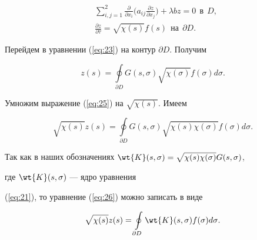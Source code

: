 \begin{equation}\label{eq:24}


\begin{split}


&\sum\limits_{i,j=1}^2 {\frac{\partial }{\partial x_i }


\bigg({a_{ij} \frac{\partial z}{\partial x_j }} \bigg)}+\lambda bz=0


\ \ \text{в} \ \ D,\\


&\frac{\partial z}{\partial \overline \tau }=\sqrt {\chi (s)} f (s)


\ \ \text{на} \ \ \partial D.


\end{split}


\end{equation}


Перейдем в уравнении (\ref{eq:23}) на контур $\partial D$. Получим


\begin{equation}\label{eq:25}


z (s)=\oint\limits_{\partial D} {G ({s,\sigma } )


\sqrt {\chi (\sigma)} f (\sigma)} d\sigma.


\end{equation}


Умножим выражение (\ref{eq:25}) на $\sqrt {\chi (s)} $. Имеем


\begin{equation}\label{eq:26}


\sqrt {\chi (s)} z (s)=\oint\limits_{\partial D} 


{G ({s,\sigma })\sqrt {\chi (s)\chi (\sigma)} f(\sigma) d\sigma }.


\end{equation}


Так как в наших обозначениях $\wt {K} ({s,\sigma }) =


\sqrt {\chi (s)\chi (\sigma)} G ({s,\sigma })$,


где $\wt {K} ({s,\sigma })$ --- ядро уравнения 


(\ref{eq:21}), то уравнение (\ref{eq:26}) можно записать в виде


\begin{equation}\label{eq:27}


\sqrt {\chi (s)} z (s)=\oint\limits_{\partial D} 


{\wt {K} ({s,\sigma })f (\sigma)d\sigma }.


\end{equation}


